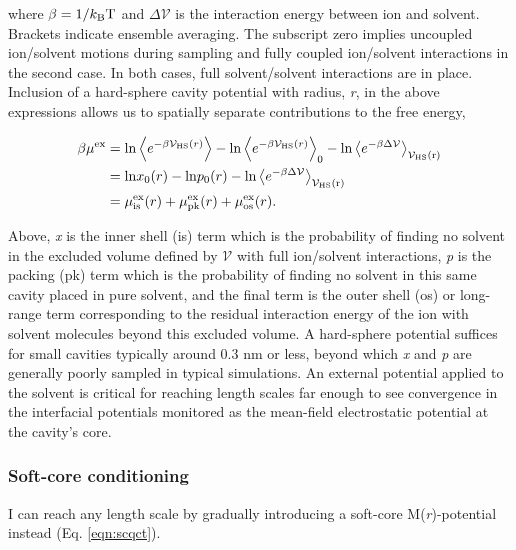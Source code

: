 \begin{theory}
  \noindent where $\beta = 1/k_{\mathrm{B}}\mathrm{T}$ and $\Delta\mathcal{V}$ is the interaction energy between ion
  and solvent. Brackets indicate ensemble averaging. The subscript zero implies uncoupled ion/solvent motions
  during sampling and fully coupled ion/solvent interactions in the second case. In both cases, full 
  solvent/solvent interactions are in place. Inclusion of a hard-sphere cavity potential with radius, \emph{r}, 
  in the above expressions allows us to spatially separate contributions to the free energy,

  \begin{equation}
   \begin{split}
    \beta\mu^{\mathrm{ex}} &= \mathrm{ln}\left<e^{-\beta\mathcal{V}_{\mathrm{HS}}(r)}\right> - \mathrm{ln}\left<e^{-\beta\mathcal{V}_{\mathrm{HS}}(r)}\right>_{\mathrm{0}} - 
                        \mathrm{ln}\left<e^{-\beta\Delta\mathcal{V}}\right>_{\mathrm{\mathcal{V}_{\mathrm{HS}}(r)}} \\
                     &= \mathrm{ln}x_{\mathrm{0}}(r) - \mathrm{ln}p_{\mathrm{0}}(r) - \mathrm{ln}\left<e^{-\beta\Delta\mathcal{V}}\right>_{\mathrm{\mathcal{V}_{\mathrm{HS}}(r)}} \\
                     &= \mu^{\mathrm{ex}}_{\mathrm{is}}(r) + \mu^{\mathrm{ex}}_{\mathrm{pk}}(r) + \mu^{\mathrm{ex}}_{\mathrm{os}}(r).
    \label{eqn:hsqct}
   \end{split}
  \end{equation}

  Above, \emph{x} is the inner shell (is) term which is the probability of finding no solvent in the 
  excluded volume defined by $\mathcal{V}$ with full ion/solvent interactions, \emph{p} is 
  the packing (pk) term which is the probability of finding no solvent in this same cavity placed in pure 
  solvent, and the final term is the outer shell (os) or long-range term corresponding to the residual 
  interaction energy of the ion with solvent molecules beyond this excluded volume. A hard-sphere potential 
  suffices for small cavities typically around 0.3 nm or less, beyond which \emph{x} and 
  \emph{p} are generally poorly sampled in typical simulations. An external potential applied to the
  solvent is critical for reaching length scales far enough to see convergence in the interfacial potentials
  monitored as the mean-field electrostatic potential at the cavity's core.
  
  \subsubsection{\label{ch2:sec4:level4:zone2}Soft-core conditioning}
  I can reach any length scale by gradually introducing a soft-core M(\emph{r})-potential instead (Eq. \ref{eqn:scqct}).
  

\end{theory}
